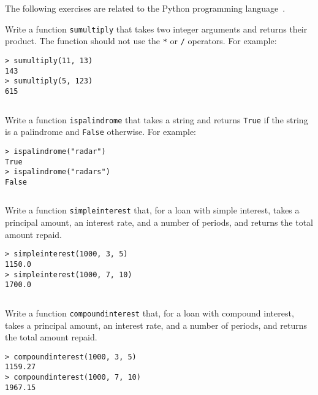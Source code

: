 \documentclass[a4paper, 12pt]{exam}
\begin{document}
\noindent
The following exercises are related to the Python programming language~\cite{pythonwebsite}.

\begin{questions}

\question
Write a function \texttt{sumultiply} that takes two integer arguments and returns their product.
The function should not use the \texttt{*} or \texttt{/} operators.
For example:
\begin{verbatim}
> sumultiply(11, 13)
143
> sumultiply(5, 123)
615
\end{verbatim}

\begin{solution}
  \inputminted{python}{solutions/sumultiply.py}
\end{solution}


\question
Write a function \texttt{ispalindrome} that takes a string and returns \texttt{True} if the string is a palindrome and \texttt{False} otherwise.
For example:
\begin{verbatim}
> ispalindrome("radar")
True
> ispalindrome("radars")
False
\end{verbatim}

\begin{solution}
  \inputminted{python}{solutions/ispalindrome.py}
\end{solution}

 
\question
Write a function \texttt{simpleinterest} that, for a loan with simple interest, takes a principal amount, an interest rate, and a number of periods, and returns the total amount repaid. 
\begin{verbatim}
> simpleinterest(1000, 3, 5)
1150.0
> simpleinterest(1000, 7, 10)
1700.0
\end{verbatim}

\begin{solution}
  \inputminted{python}{solutions/simpleinterest.py}
\end{solution}


\question
Write a function \texttt{compoundinterest} that, for a loan with compound interest, takes a principal amount, an interest rate, and a number of periods, and returns the total amount repaid. 
\begin{verbatim}
> compoundinterest(1000, 3, 5)
1159.27
> compoundinterest(1000, 7, 10)
1967.15
\end{verbatim}

\begin{solution}
  \inputminted{python}{solutions/compoundinterest.py}
\end{solution}



\end{questions}
\end{document}
